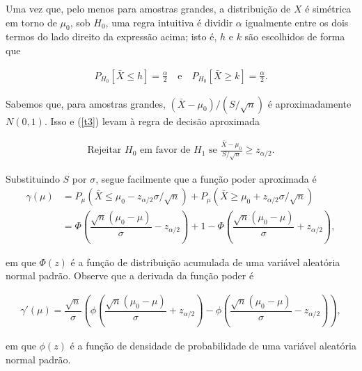 \documentclass[12pt]{beamer}
\begin{document}
\begin{frame}{}
\begin{block}{}
\justifying
Uma vez que, pelo menos para amostras grandes, a distribuição de $X$ é simétrica em torno de $\mu_0$, sob $H_0$, uma regra intuitiva é dividir $\alpha$ igualmente entre os dois termos do lado direito da expressão acima; isto é, $h$ e $k$ são escolhidos de forma que

\begin{align}\label{t3}
P_{H_0} [\bar{X} \leq h] = \frac{\alpha}{2} \quad \text{e} \quad P_{H_0} [\bar{X} \geq k] = \frac{\alpha}{2}.
\end{align}

Sabemos que, para amostras grandes, $(\bar{X} - \mu_0) / (S / \sqrt{n})$ é aproximadamente $N(0, 1)$. Isso e (\ref{t3}) levam à regra de decisão aproximada

\begin{align}\label{t4}
\text{Rejeitar } H_0 \text{ em favor de } H_1 \text{ se } \frac{\bar{X} - \mu_0}{S / \sqrt{n}} \geq z_{\alpha/2}.
\end{align}
\end{block}
\end{frame}

\begin{frame}{}
\begin{block}{}
\justifying
Substituindo $S$ por $\sigma$, segue facilmente que a função poder aproximada é
\begin{align*}\label{t5}
\gamma(\mu) &= P_{\mu}(\bar{X} \leq \mu_0 - z_{\alpha/2} \sigma / \sqrt{n}) + P_{\mu}(\bar{X} \geq \mu_0 + z_{\alpha/2} \sigma / \sqrt{n})\\
&= \Phi\left(\dfrac{\sqrt{n}(\mu_0 - \mu)}{\sigma} - z_{\alpha/2}\right) + 1 - \Phi\left(\dfrac{\sqrt{n}(\mu_0 - \mu)}{\sigma} + z_{\alpha/2}\right), 
\end{align*}

em que $\Phi(z)$ é a função de distribuição acumulada de uma variável aleatória normal padrão. Observe que a derivada da função poder é

\begin{align*}
\gamma'(\mu) = \dfrac{\sqrt{n}}{\sigma} \left(\phi\left(\dfrac{\sqrt{n}(\mu_0 - \mu)}{\sigma} + z_{\alpha/2}\right) - \phi\left(\dfrac{\sqrt{n}(\mu_0 - \mu)}{\sigma} - z_{\alpha/2}\right)\right),
\end{align*}

em que $\phi(z)$ é a função de densidade de probabilidade de uma variável aleatória normal padrão. 
\end{block}
\end{frame}
\end{document}
